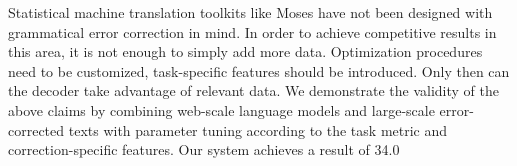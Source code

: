 Statistical machine translation toolkits like Moses have not been designed with grammatical error correction in mind. In order to achieve competitive results in this area, it is not enough to simply add more data. Optimization procedures need to be customized, task-specific features should be introduced. Only then can the decoder take advantage of relevant data. We demonstrate the validity of the above claims by combining web-scale language models and large-scale error-corrected texts with parameter tuning according to the task metric and correction-specific features. Our system achieves a result of 34.0\\%
